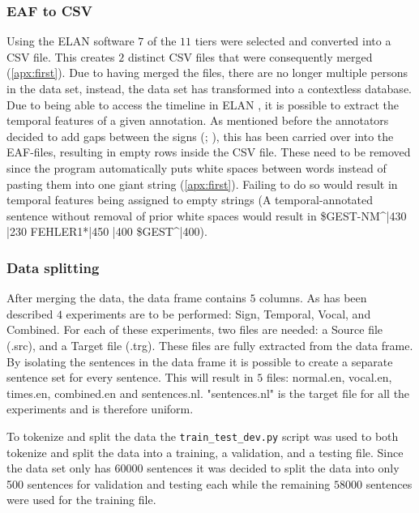 \subsubsection{EAF to CSV}
Using the ELAN software $7$ of the $11$ tiers were selected and converted into a CSV file. This creates $2$ distinct CSV files that were consequently merged (\autoref{apx:first}). Due to having merged the files, there are no longer multiple persons in the data set, instead, the data set has transformed into a contextless database. Due to being able to access the timeline in ELAN \cite{elan_software}, it is possible to extract the temporal features of a given annotation. As mentioned before the annotators decided to add gaps between the signs (\citealp{hankesegmentation}; \citealp{konradoffentliches}), this has been carried over into the EAF-files, resulting in empty rows inside the CSV file. These need to be removed since the program automatically puts white spaces between words instead of pasting them into one giant string (\autoref{apx:first}). Failing to do so would result in temporal features being assigned to empty strings (A temporal-annotated sentence without removal of prior white spaces would result in \$GEST-NM\textasciicircum|430 |230 FEHLER1*|450 |400 \$GEST\textasciicircum|400).

\subsubsection{Data splitting}

After merging the data, the data frame contains $5$ columns. As has been described $4$ experiments are to be performed: Sign, Temporal, Vocal, and Combined. For each of these experiments, two files are needed: a Source file (.src), and a Target file (.trg). These files are fully extracted from the data frame. By isolating the sentences in the data frame it is possible to create a separate sentence set for every sentence. This will result in $5$ files: normal.en, vocal.en, times.en, combined.en and sentences.nl. "sentences.nl" is the target file for all the experiments and is therefore uniform.

To tokenize and split the data the \texttt{train\_test\_dev.py} \cite{dimitarshterionovtrain} script was used to both tokenize and split the data into a training, a validation, and a testing file. Since the data set only has $60000$ sentences it was decided to split the data into only 500 sentences for validation and testing each while the remaining $58000$ sentences were used for the training file.

